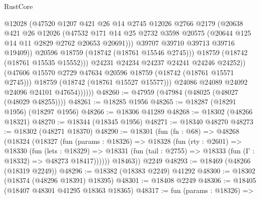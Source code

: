 \begin{lexlean}{RustCore}
\begin{coremodule}
                            @12028
                            (@47520
                              @1207
                              @421
                              @26
                              @14
                              @2745
                              @12026
                              @2766
                              @2179
                              (@20638
                                @421
                                @26
                                @12026
                                (@47532
                                  @171
                                  @14
                                  @25
                                  @2732
                                  @3598
                                  @20575
                                  (@20644 @125 @14 @11 @2829 @2762 @20653 @20691)))
                              @39707
                              @39710
                              @39713
                              @39716
                              @19409))
                          @20596
                          @18759
                          (@18742 (@18761 @15546 @2745)))
                        @18759
                        (@18742 (@18761 @15535 @15552)))
                      @24231
                      @24234
                      @24237
                      @24241
                      @24246
                      @24252))
                  (@47606 @15570 @2729 @47634 @20596 @18759 (@18742 (@18761 @15571 @2745)))
                  @18759
                  (@18742 (@18761 @15527 @15577)))
                @24086
                @24089
                @24092
                @24096
                @24101
                @47654))))))
@48260 := @47959 (@47984 (@48025 (@48027 (@48029 @48255))))
@48261 := @18285 @1956
@48265 := @18287 (@18291 @1956) (@18297 @1956)
@48266 := @18306 @41289
@48268 := @18302 (@48266 @18321)
@48270 := @18344 (@18345 @1956)
@48271 := @18340 @48270
@48273 := @18302 (@48271 @18370)
@48290 := @18301
    (fun (fn : @68) =>
    @48268
      (@18324
        (@18327
          (fun (params : @18326) =>
          @18328
            (fun (rty : @2601) =>
            @18330
              (fun (lets : @18329) =>
              @18331 (fun (tail : @2755) => @18333 (fun (Γ : @18332) => @48273 @18417))))))
        @18463))
    @2249
@48293 := @18469 (@48266 (@18319 @2249))
@48296 := @18382 (@18383 @2249) @41292
@48300 := @18302 (@18374 (@48296 @18391) @18395)
@48301 := @18408 @2249
@48306 := @18405 (@18407 @48301 @41295 @18363 @18365)
@48317 := fun (params : @18326) =>

\end{coremodule}
\end{lexlean}
